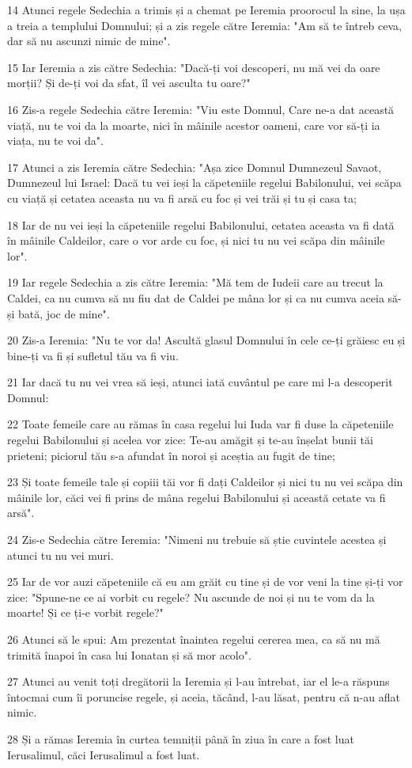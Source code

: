 \par 14 Atunci regele Sedechia a trimis și a chemat pe Ieremia proorocul la sine, la ușa a treia a templului Domnului; și a zis regele către Ieremia: "Am să te întreb ceva, dar să nu ascunzi nimic de mine".
\par 15 Iar Ieremia a zis către Sedechia: "Dacă-ți voi descoperi, nu mă vei da oare morții? Și de-ți voi da sfat, îl vei asculta tu oare?"
\par 16 Zis-a regele Sedechia către Ieremia: "Viu este Domnul, Care ne-a dat această viață, nu te voi da la moarte, nici în mâinile acestor oameni, care vor să-ți ia viața, nu te voi da".
\par 17 Atunci a zis Ieremia către Sedechia: "Așa zice Domnul Dumnezeul Savaot, Dumnezeul lui Israel: Dacă tu vei ieși la căpeteniile regelui Babilonului, vei scăpa cu viață și cetatea aceasta nu va fi arsă cu foc și vei trăi și tu și casa ta;
\par 18 Iar de nu vei ieși la căpeteniile regelui Babilonului, cetatea aceasta va fi dată în mâinile Caldeilor, care o vor arde cu foc, și nici tu nu vei scăpa din mâinile lor".
\par 19 Iar regele Sedechia a zis către Ieremia: "Mă tem de Iudeii care au trecut la Caldei, ca nu cumva să nu fiu dat de Caldei pe mâna lor și ca nu cumva aceia să-și bată, joc de mine".
\par 20 Zis-a Ieremia: "Nu te vor da! Ascultă glasul Domnului în cele ce-ți grăiesc eu și bine-ți va fi și sufletul tău va fi viu.
\par 21 Iar dacă tu nu vei vrea să ieși, atunci iată cuvântul pe care mi l-a descoperit Domnul:
\par 22 Toate femeile care au rămas în casa regelui lui Iuda var fi duse la căpeteniile regelui Babilonului și acelea vor zice: Te-au amăgit și te-au înșelat bunii tăi prieteni; piciorul tău s-a afundat în noroi și aceștia au fugit de tine;
\par 23 Și toate femeile tale și copiii tăi vor fi dați Caldeilor și nici tu nu vei scăpa din mâinile lor, căci vei fi prins de mâna regelui Babilonului și această cetate va fi arsă".
\par 24 Zis-e Sedechia către Ieremia: "Nimeni nu trebuie să știe cuvintele acestea și atunci tu nu vei muri.
\par 25 Iar de vor auzi căpeteniile că eu am grăit cu tine și de vor veni la tine și-ți vor zice: "Spune-ne ce ai vorbit cu regele? Nu ascunde de noi și nu te vom da la moarte! Și ce ți-e vorbit regele?"
\par 26 Atunci să le spui: Am prezentat înaintea regelui cererea mea, ca să nu mă trimită înapoi în casa lui Ionatan și să mor acolo".
\par 27 Atunci au venit toți dregătorii la Ieremia și l-au întrebat, iar el le-a răspuns întocmai cum îi poruncise regele, și aceia, tăcând, l-au lăsat, pentru că n-au aflat nimic.
\par 28 Și a rămas Ieremia în curtea temniții până în ziua în care a fost luat Ierusalimul, căci Ierusalimul a fost luat.

